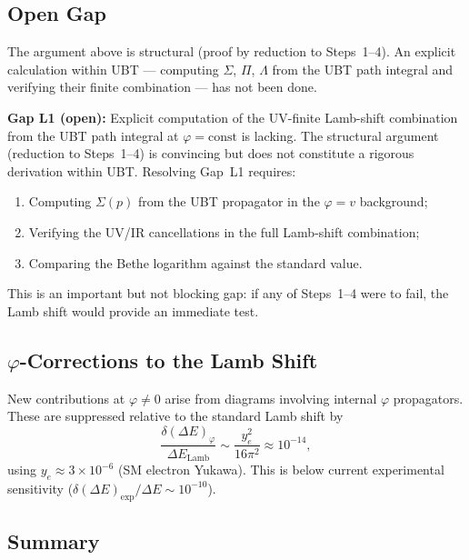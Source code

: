 \documentclass[12pt]{article}
\theoremstyle{definition}
\theoremstyle{remark}
\begin{document}
\subsection{Open Gap}

The argument above is structural (proof by reduction to Steps~1--4).  An explicit
calculation within UBT — computing $\Sigma$, $\Pi$, $\Lambda$ from the UBT path integral
and verifying their finite combination — has not been done.

\begin{gapbox}
\textbf{Gap L1 (open):}
Explicit computation of the UV-finite Lamb-shift combination from the UBT path integral
at $\varphi = \mathrm{const}$ is lacking.  The structural argument (reduction to Steps~1--4)
is convincing but does not constitute a rigorous derivation within UBT.  Resolving Gap~L1
requires:
\begin{enumerate}
  \item Computing $\Sigma(p)$ from the UBT propagator in the $\varphi = v$ background;
  \item Verifying the UV/IR cancellations in the full Lamb-shift combination;
  \item Comparing the Bethe logarithm against the standard value.
\end{enumerate}
This is an important but not blocking gap: if any of Steps~1--4 were to fail, the Lamb
shift would provide an immediate test.
\end{gapbox}

\subsection{$\varphi$-Corrections to the Lamb Shift}

New contributions at $\varphi \neq 0$ arise from diagrams involving internal $\varphi$
propagators.  These are suppressed relative to the standard Lamb shift by
\begin{equation}
  \frac{\delta(\Delta E)_\varphi}{\Delta E_\mathrm{Lamb}}
  \sim \frac{y_e^2}{16\pi^2} \approx 10^{-14},
\end{equation}
using $y_e \approx 3\times10^{-6}$ (SM electron Yukawa).  This is below current experimental
sensitivity ($\delta(\Delta E)_\mathrm{exp}/\Delta E \sim 10^{-10}$).

\subsection{Summary}
\end{document}
